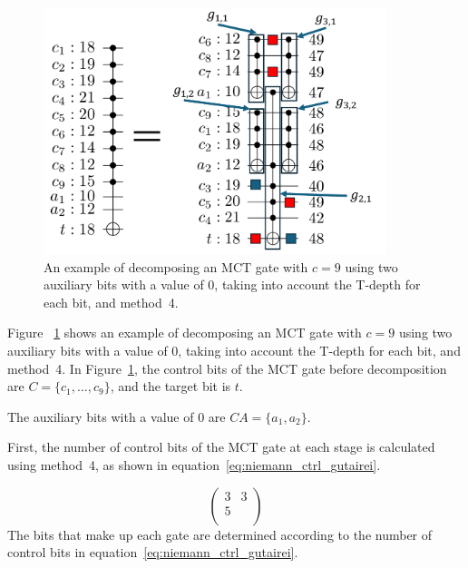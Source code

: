 \par
\begin{figure}

\centering

\includegraphics[width=10cm]{img/niemann_proposed.pdf}

\caption{An example of decomposing an MCT gate with $c=9$ using two auxiliary bits with a value of 0,
taking into account the T-depth for each bit, and method~4.}

\label{niemann_proposed}

\end{figure}

Figure ~\ref{niemann_proposed} shows an example of decomposing an MCT gate with $c=9$ using two auxiliary bits with a value of 0,
taking into account the T-depth for each bit, and method~4.
In Figure~\ref{niemann_proposed},
the control bits of the MCT gate before decomposition are $C=\{c_{1},\dots, c_{9}\}$, and the target bit is $t$.

The auxiliary bits with a value of 0 are $CA=\{a_{1}, a_{2}\}$.

First, the number of control bits of the MCT gate at each stage is calculated using method~4, as shown in equation~\ref{eq:niemann_ctrl_gutairei}.

\begin{equation}\label{eq:niemann_ctrl_gutairei}
\begin{pmatrix}

3 & 3 \\

5 & \\
\end{pmatrix}
\end{equation}
The bits that make up each gate are determined according to the number of control bits in equation~\ref{eq:niemann_ctrl_gutairei}.

